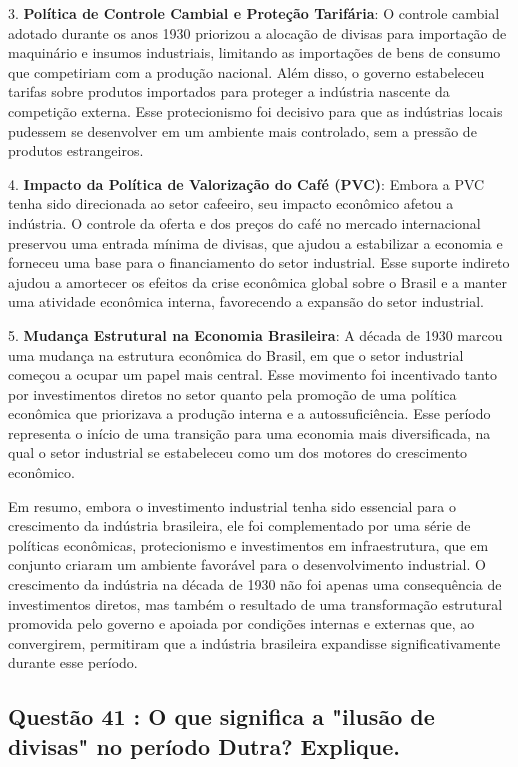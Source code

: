 \documentclass[a4paper,12pt]{article}[abntex2]
\begin{document}
3. \textbf{Política de Controle Cambial e Proteção Tarifária}: O controle cambial adotado durante os anos 1930 priorizou a alocação de divisas para importação de maquinário e insumos industriais, limitando as importações de bens de consumo que competiriam com a produção nacional. Além disso, o governo estabeleceu tarifas sobre produtos importados para proteger a indústria nascente da competição externa. Esse protecionismo foi decisivo para que as indústrias locais pudessem se desenvolver em um ambiente mais controlado, sem a pressão de produtos estrangeiros.

4. \textbf{Impacto da Política de Valorização do Café (PVC)}: Embora a PVC tenha sido direcionada ao setor cafeeiro, seu impacto econômico afetou a indústria. O controle da oferta e dos preços do café no mercado internacional preservou uma entrada mínima de divisas, que ajudou a estabilizar a economia e forneceu uma base para o financiamento do setor industrial. Esse suporte indireto ajudou a amortecer os efeitos da crise econômica global sobre o Brasil e a manter uma atividade econômica interna, favorecendo a expansão do setor industrial.

5. \textbf{Mudança Estrutural na Economia Brasileira}: A década de 1930 marcou uma mudança na estrutura econômica do Brasil, em que o setor industrial começou a ocupar um papel mais central. Esse movimento foi incentivado tanto por investimentos diretos no setor quanto pela promoção de uma política econômica que priorizava a produção interna e a autossuficiência. Esse período representa o início de uma transição para uma economia mais diversificada, na qual o setor industrial se estabeleceu como um dos motores do crescimento econômico.

Em resumo, embora o investimento industrial tenha sido essencial para o crescimento da indústria brasileira, ele foi complementado por uma série de políticas econômicas, protecionismo e investimentos em infraestrutura, que em conjunto criaram um ambiente favorável para o desenvolvimento industrial. O crescimento da indústria na década de 1930 não foi apenas uma consequência de investimentos diretos, mas também o resultado de uma transformação estrutural promovida pelo governo e apoiada por condições internas e externas que, ao convergirem, permitiram que a indústria brasileira expandisse significativamente durante esse período.

\subsection{\textbf{Questão 41 : O que significa a "ilusão de divisas" no período Dutra? Explique.}}
\end{document}
